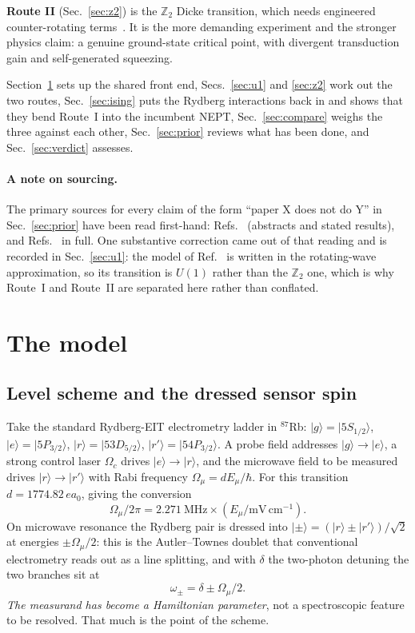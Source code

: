 \documentclass[11pt,a4paper]{article}
\newcommand{\Om}{\Omega}
\newcommand{\Omu}{\Omega_{\mu}}
\newcommand{\ket}[1]{\lvert #1 \rangle}
\begin{document}
\textbf{Route II} (Sec.~\ref{sec:z2}) is the $\mathbb{Z}_2$ Dicke transition, which needs
engineered counter-rotating terms~\cite{Dimer2007,Baden2014,Anisotropic2025}. It is the more
demanding experiment and the stronger physics claim: a genuine ground-state critical point,
with divergent transduction gain and self-generated squeezing.

Section~\ref{sec:model} sets up the shared front end, Secs.~\ref{sec:u1} and \ref{sec:z2} work
out the two routes, Sec.~\ref{sec:ising} puts the Rydberg interactions back in and shows that
they bend Route~I into the incumbent NEPT, Sec.~\ref{sec:compare} weighs the three against each
other, Sec.~\ref{sec:prior} reviews what has been done, and Sec.~\ref{sec:verdict} assesses.

\paragraph{A note on sourcing.} The primary sources for every claim of the form ``paper X does
not do Y'' in Sec.~\ref{sec:prior} have been read first-hand: Refs.~\cite{Peng2018, Yang2020,
Wang2023} (abstracts and stated results), and Refs.~\cite{Zhang2013, Ding2022, Wang2025} in
full. One substantive correction came out of that reading and is recorded in
Sec.~\ref{sec:u1}: the model of Ref.~\cite{Zhang2013} is written in the rotating-wave
approximation, so its transition is $U(1)$ rather than the $\mathbb{Z}_2$ one, which is why
Route~I and Route~II are separated here rather than conflated.

\section{The model}
\label{sec:model}

\subsection{Level scheme and the dressed sensor spin}

Take the standard Rydberg-EIT electrometry ladder in $^{87}$Rb:
$\ket{g}=\ket{5S_{1/2}}$, $\ket{e}=\ket{5P_{3/2}}$, $\ket{r}=\ket{53D_{5/2}}$,
$\ket{r'}=\ket{54P_{3/2}}$. A probe field addresses $\ket{g}\!\to\!\ket{e}$, a strong
control laser $\Om_c$ drives $\ket{e}\!\to\!\ket{r}$, and the microwave field to be measured
drives $\ket{r}\!\to\!\ket{r'}$ with Rabi frequency $\Omu = dE_\mu/\hbar$. For this
transition $d = 1774.82\,ea_0$, giving the conversion
\begin{equation}
  \Omu/2\pi = 2.271~\mathrm{MHz} \times \left(E_\mu / \mathrm{mV\,cm^{-1}}\right).
\end{equation}
On microwave resonance the Rydberg pair is dressed into
$\ket{\pm} = (\ket{r}\pm\ket{r'})/\sqrt2$ at energies $\pm\Omu/2$: this is the
Autler--Townes doublet that conventional electrometry reads out as a line splitting, and
with $\delta$ the two-photon detuning the two branches sit at
\begin{equation}
  \omega_\pm = \delta \pm \Omu/2 .
  \label{eq:branches}
\end{equation}
\emph{The measurand has become a Hamiltonian parameter}, not a spectroscopic feature to be
resolved. That much is the point of the scheme.
\end{document}
